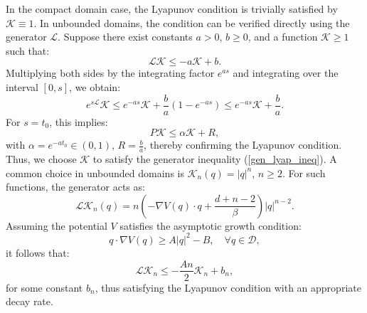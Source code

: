 \documentclass[11pt, twoside]{report}
\begin{document}
In the compact domain case, the Lyapunov condition is trivially satisfied by $\mathcal{K} \equiv 1$. In unbounded domains, the condition can be verified directly using the generator $\mathcal{L}$. Suppose there exist constants $a > 0$, $b \geq 0$, and a function $\mathcal{K} \geq 1$ such that:
\begin{equation} \label{gen_lyap_ineq}
    \mathcal{L}\mathcal{K} \leq -a \mathcal{K} + b.
\end{equation}
Multiplying both sides by the integrating factor $e^{as}$ and integrating over the interval $[0, s]$, we obtain:
\[
e^{s \mathcal{L}} \mathcal{K} \leq e^{-as} \mathcal{K} + \frac{b}{a}(1 - e^{-as}) \leq e^{-as} \mathcal{K} + \frac{b}{a}.
\]
For $s = t_0$, this implies:
\[
P \mathcal{K} \leq \alpha \mathcal{K} + R,
\]
with $\alpha = e^{-a t_0} \in (0,1)$, $R = \frac{b}{a}$, thereby confirming the Lyapunov condition. Thus, we choose $\mathcal{K}$ to satisfy the generator inequality (\ref{gen_lyap_ineq}). A common choice in unbounded domains is $\mathcal{K}_n(q) = |q|^n$, $n \geq 2$. For such functions, the generator acts as:
\[
\mathcal{L} \mathcal{K}_n(q) = n \left( -\nabla V(q) \cdot q + \frac{d + n - 2}{\beta} \right) |q|^{n - 2}.
\]
Assuming the potential $V$ satisfies the asymptotic growth condition:
\[
q \cdot \nabla V(q) \geq A |q|^2 - B, \quad \forall q \in \mathcal{D},
\]
it follows that:
\[
\mathcal{L} \mathcal{K}_n \leq -\frac{A n}{2} \mathcal{K}_n + b_n,
\]
for some constant $b_n$, thus satisfying the Lyapunov condition with an appropriate decay rate.
\end{document}
